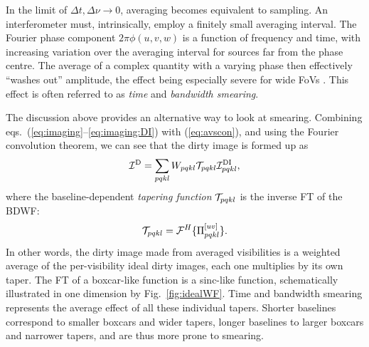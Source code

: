 \documentclass[useAMS,usenatbib]{mn2e}
\begin{document}
In the limit of $\Delta t,\Delta \nu \rightarrow 0$, averaging becomes equivalent to sampling. 
An interferometer must, intrinsically, employ a finitely small averaging interval. The Fourier phase 
component $2\pi\phi(u,v,w)$ is a function of frequency and time, with increasing variation over the averaging interval 
for sources far from the phase centre. The average of a complex quantity with a varying phase then effectively ``washes out'' 
amplitude, the effect being especially severe for wide FoVs \citep[for an extensive discussion, see][]{bregman2012system}. This
effect is often referred to as \emph{time} and \emph{bandwidth smearing}.

The discussion above provides an alternative way to look at smearing. Combining eqs.~(\ref{eq:imaging}--\ref{eq:imaging:DI}) with 
(\ref{eq:avscon}), and using the Fourier convolution theorem, we can see that the dirty image is formed up as
\begin{equation}
\mathcal{I}^\mathrm{D} =  \sum_{pqkl} W_{pqkl}  \mathcal{T}_{pqkl} \mathcal{I}^\mathrm{DI}_{pqkl},
\end{equation}
where the baseline-dependent \emph{tapering function} $\mathcal{T}_{pqkl}$ is the inverse FT of the BDWF:
\begin{equation}
\mathcal{T}_{pqkl} = \mathcal{F}^H\{ \Pi^{[uv]}_{pqkl} \}.
\end{equation}
In other words, the dirty image made from averaged visibilities is a weighted average of the per-visibility ideal dirty images, 
each one multiplies by its own taper. The FT of a boxcar-like function is a sinc-like function, schematically illustrated in one
dimension by Fig.~\ref{fig:idealWF}. Time and bandwidth smearing represents the average effect 
of all these individual tapers. Shorter baselines correspond to smaller boxcars and wider tapers, longer baselines to larger 
boxcars and narrower tapers, and are thus more prone to smearing.
\end{document}
